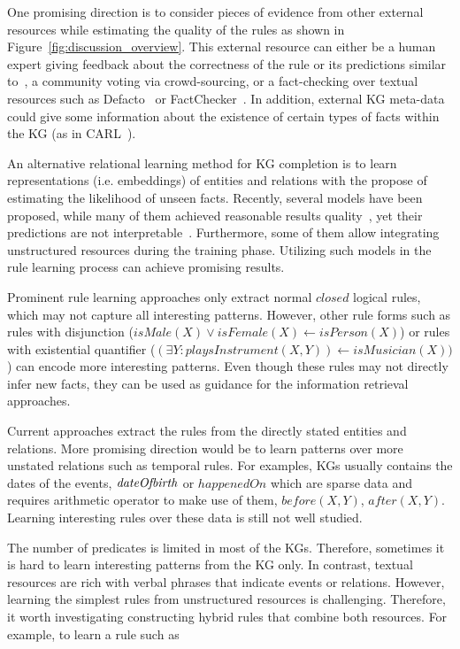 One promising direction is to consider pieces of evidence from other external resources while estimating the quality of the rules as shown in Figure~\ref{fig:discussion_overview}. This external resource can either be a human expert giving feedback about the correctness of the rule or its predictions similar to~\cite{Dzyuba2017}, a community voting via crowd-sourcing, or a fact-checking over textual resources such as Defacto~\cite{defacto} or FactChecker~\cite{factchecker}. In addition, external KG meta-data could give some information about the existence of certain types of facts within the KG (as in CARL~\cite{carl}).

An alternative relational learning method for KG completion is to learn representations (i.e. embeddings) of entities and relations with the propose of estimating the likelihood of unseen facts. Recently, several models have been proposed, while many of them achieved reasonable results quality~\cite{Wang2017}, yet their predictions are not interpretable~\cite{Shakerin2018}. Furthermore, some of them allow integrating unstructured resources during the training phase. Utilizing such models in the rule learning process can achieve promising results.%

Prominent rule learning approaches only extract normal $closed$ logical rules, which may not capture all interesting patterns. However, other rule forms such as rules with disjunction (\eg $isMale(X) \vee isFemale(X) \leftarrow isPerson(X)$) or rules with existential quantifier (\eg $(\exists Y: playsInstrument(X, Y)) \leftarrow isMusician(X))$) can encode more interesting patterns. Even though these rules may not directly infer new facts, they can be used as guidance for the information retrieval approaches.


 Current approaches extract the rules from the directly stated entities and relations. More promising direction would be to learn patterns over more unstated relations such as temporal rules. For examples, KGs usually contains the dates of the events, \eg $\mathit{dateOfbirth}$ or $happenedOn$ which are sparse data and requires arithmetic operator to make use of them, \eg $before(X,Y)$, $after(X,Y)$. Learning interesting rules over these data is still not well studied.


 The number of predicates is limited in most of the KGs. Therefore, sometimes it is hard to learn interesting patterns from the KG only. In contrast, textual resources are rich with verbal phrases that indicate events or relations. However, learning the simplest rules from unstructured resources is challenging. Therefore, it worth investigating constructing hybrid rules that combine both resources.  For example, to learn a rule such as

